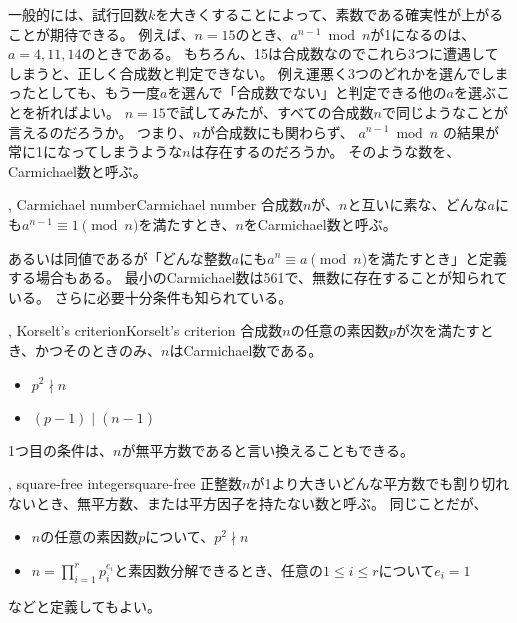
一般的には、試行回数$k$を大きくすることによって、素数である確実性が上がることが期待できる。
例えば、$n=15$のとき、$a^{n-1} \bmod{n}$が1になるのは、$a=4,11,14$のときである。
もちろん、15は合成数なのでこれら3つに遭遇してしまうと、正しく合成数と判定できない。
例え運悪く3つのどれかを選んでしまったとしても、もう一度$a$を選んで「合成数でない」と判定できる他の$a$を選ぶことを祈ればよい。
$n=15$で試してみたが、すべての合成数$n$で同じようなことが言えるのだろうか。
つまり、$n$が合成数にも関わらず、 $a^{n−1} \bmod{n}$ の結果が常に1になってしまうような$n$は存在するのだろうか。
そのような数を、Carmichael数と呼ぶ。

\begin{Defi}{, Carmichael number}{Carmichael number}
合成数$n$が、$n$と互いに素な、どんな$a$にも$a^{n−1}\equiv 1 \pmod{n}$を満たすとき、$n$をCarmichael数と呼ぶ。
\end{Defi}

あるいは同値であるが「どんな整数$a$にも$a^{n}\equiv a \pmod{n}$を満たすとき」と定義する場合もある。
最小のCarmichael数は561で、無数に存在することが知られている\cite{Alford1994}。
さらに必要十分条件も知られている。

\begin{Theo}{, Korselt's criterion}{Korselt's criterion}
合成数$n$の任意の素因数$p$が次を満たすとき、かつそのときのみ、$n$はCarmichael数である。
\begin{itemize}
 \item $p^2 \nmid n$
 \item $(p − 1) \mid (n-1)$
\end{itemize}
\end{Theo}

1つ目の条件は、$n$が無平方数であると言い換えることもできる。

\begin{Defi}{, square-free integer}{square-free}
正整数$n$が1より大きいどんな平方数でも割り切れないとき、無平方数、または平方因子を持たない数と呼ぶ。
同じことだが、
\begin{itemize}
 \item $n$の任意の素因数$p$について、$p^2 \nmid n$
 \item $n=\prod_{i=1}^r p_i^{e_i}$と素因数分解できるとき、任意の$1\le i \le r$について$e_i=1$
\end{itemize}
などと定義してもよい。
\end{Defi}

